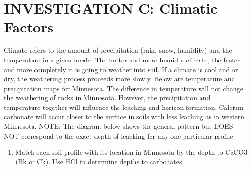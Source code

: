 \documentclass[
  letterpaper,
  twocolumn,
  portrait]{scrbook}
\providecommand{\tightlist}{%
  \setlength{\itemsep}{0pt}\setlength{\parskip}{0pt}}\usepackage{longtable,booktabs,array}
\begin{document}
\hypertarget{investigation-c-climatic-factors}{%
\section{INVESTIGATION C: Climatic
Factors}\label{investigation-c-climatic-factors}}

Climate refers to the amount of precipitation (rain, snow, humidity) and
the temperature in a given locale. The hotter and more humid a climate,
the faster and more completely it is going to weather into soil. If a
climate is cool and or dry, the weathering process proceeds more slowly.
Below are temperature and precipitation maps for Minnesota. The
difference in temperature will not change the weathering of rocks in
Minnesota. However, the precipitation and temperature together will
influence the leaching and horizon formation. Calcium carbonate will
occur closer to the surface in soils with less leaching as in western
Minnesota. NOTE: The diagram below shows the general pattern but DOES
NOT correspond to the exact depth of leaching for any one particular
profile.

\begin{enumerate}
\def\labelenumi{\arabic{enumi}.}
\tightlist
\item
  Match each soil profile with its location in Minnesota by the depth to
  CaCO3 (Bk or Ck). Use HCl to determine depths to carbonates.
\end{enumerate}
\end{document}
